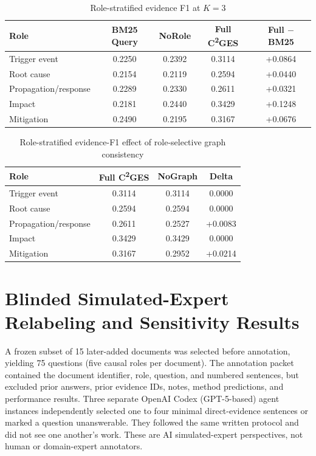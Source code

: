 \documentclass[11pt,letterpaper]{article}
\newcommand{\cges}{C\textsuperscript{2}GES}
\begin{document}
\begin{table}[ht]
\centering
\small
\caption{Role-stratified evidence F1 at $K=3$}
\begin{tabular}{lcccc}
\toprule
\textbf{Role} & \textbf{BM25 Query} & \textbf{NoRole} & \textbf{Full \cges{}} & \textbf{Full $-$ BM25} \\
\midrule
Trigger event & 0.2250 & 0.2392 & 0.3114 & +0.0864 \\
Root cause & 0.2154 & 0.2119 & 0.2594 & +0.0440 \\
Propagation/response & 0.2289 & 0.2330 & 0.2611 & +0.0321 \\
Impact & 0.2181 & 0.2440 & 0.3429 & +0.1248 \\
Mitigation & 0.2490 & 0.2195 & 0.3167 & +0.0676 \\
\bottomrule
\end{tabular}
\end{table}

\begin{table}[ht]
\centering
\small
\caption{Role-stratified evidence-F1 effect of role-selective graph consistency}
\begin{tabular}{lccc}
\toprule
\textbf{Role} & \textbf{Full \cges{}} & \textbf{NoGraph} & \textbf{Delta} \\
\midrule
Trigger event & 0.3114 & 0.3114 & 0.0000 \\
Root cause & 0.2594 & 0.2594 & 0.0000 \\
Propagation/response & 0.2611 & 0.2527 & +0.0083 \\
Impact & 0.3429 & 0.3429 & 0.0000 \\
Mitigation & 0.3167 & 0.2952 & +0.0214 \\
\bottomrule
\end{tabular}
\end{table}

\section{Blinded Simulated-Expert Relabeling and Sensitivity Results}
\label{sec:s8}

A frozen subset of 15 later-added documents was selected before annotation, yielding 75 questions (five causal roles per document). The annotation packet contained the document identifier, role, question, and numbered sentences, but excluded prior answers, prior evidence IDs, notes, method predictions, and performance results. Three separate OpenAI Codex (GPT-5-based) agent instances independently selected one to four minimal direct-evidence sentences or marked a question unanswerable. They followed the same written protocol and did not see one another's work. These are AI simulated-expert perspectives, not human or domain-expert annotators.
\end{document}
